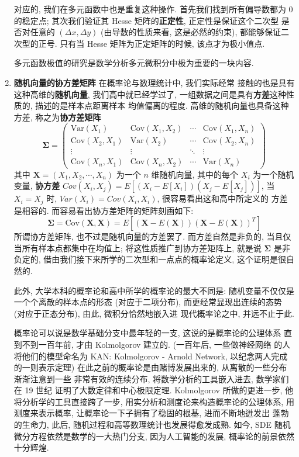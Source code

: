 \documentclass[UTF8]{book}
\begin{document}
\begin{enumerate}
    对应的, 我们在多元函数中也是重复这种操作. 首先我们找到所有偏导数都为 0 
    的稳定点; 其次我们验证其 Hesse 矩阵的\textbf{正定性}, 正定性是保证这个二次型
    是否对任意的 $(\Delta x, \Delta y)$ (由导数的性质来看, 这是必然的约束), 
    都能够保证二次型的正号. 只有当 Hesse 矩阵为正定矩阵的时候, 
    该点才为极小值点. 

    多元函数极值的研究是数学分析多元微积分中极为重要的一块内容. 

    \item \textbf{随机向量的协方差矩阵} 在概率论与数理统计中, 我们实际经常
    接触的也是具有这种高维的\textbf{随机向量}, 我们高中就已经学过了, 
    一组数据之间是具有\textbf{方差}这种性质的, 描述的是样本点距离样本
    均值偏离的程度. 高维的随机向量也具备这种方差, 称之为\textbf{协方差矩阵} 
    \[
    \boldsymbol{\Sigma}=
    \begin{pmatrix}
    \text{Var}(X_1) & \text{Cov}(X_1,X_2) & \cdots & \text{Cov}(X_1,X_n) \\
    \text{Cov}(X_2,X_1) & \text{Var}(X_2) & \cdots & \text{Cov}(X_2,X_n) \\
    \vdots & \vdots & \ddots & \vdots \\
    \text{Cov}(X_n,X_1) & \text{Cov}(X_n,X_2) & \cdots & \text{Var}(X_n)
    \end{pmatrix}
    \]
    其中 $\boldsymbol{X} = (X_1,X_2,\cdots,X_n)$ 为一个 $n$ 维随机向量, 
    其中的每个 $X_i$ 为一个随机变量, 
    \textbf{协方差} $Cov(X_i,X_j) = E[(X_i-E[X_i])(X_j-E[X_j])]$, 
    当 $X_i = X_j$ 时, $Var(X_i)=Cov(X_i,X_i)$, 很容易看出这和高中所定义的
    方差是相容的. 
    而容易看出协方差矩阵的矩阵刻画如下: 
    $$\boldsymbol{\Sigma}=\text{Cov}(\mathbf{X},\mathbf{X}) = 
    E\left[(\mathbf{X}-E(\mathbf{X}))(\mathbf{X}-E(\mathbf{X}))^T\right]$$
    所谓协方差矩阵, 也不过是随机向量的方差罢了. 
    而方差自然是非负的, 当且仅当所有样本点都集中在均值上; 
    将这性质推广到协方差矩阵上, 就是说 $\boldsymbol{\Sigma}$ 是非负定的, 
    借由我们接下来所学的二次型和一点点的概率论定义, 这个证明是很自然的. 

    此外, 大学本科的概率论和高中所学的概率论的最大不同是: 
    随机变量不仅仅是一个个离散的样本点的形态 (对应于二项分布), 
    而更经常显现出连续的态势 (对应于正态分布), 由此, 微积分恰然地嵌入进
    现代概率论之中, 并远不止于此.

    概率论可以说是数学基础分支中最年轻的一支, 这说的是概率论的公理体系
    直到不到一百年前, 才由 Kolmolgorov 建立的. (一百年后, 一些做神经网络
    的人将他们的模型命名为 KAN: Kolmolgorov - Arnold Network, 
    以纪念两人完成的一则表示定理) 
    在此之前的概率论是由赌博发展出来的, 从离散的一些分布渐渐注意到一些
    非常有效的连续分布, 将数学分析的工具嵌入进去, 数学家们在 19 世纪
    证明了大数定律和中心极限定理. Kolmolgorov 所做的更进一步, 
    他将分析学的工具直接跨了一步, 用实分析和测度论来构造概率论的公理体系, 
    用测度来表示概率, 让概率论一下子拥有了稳固的根基, 进而不断地迸发出
    蓬勃的生命力, 此后, 随机过程和高等数理统计也发展得愈发成熟. 
    如今, SDE 随机微分方程依然是数学的一大热门分支, 因为人工智能的发展, 
    概率论的前景依然十分辉煌. 


\end{enumerate}
\end{document}
